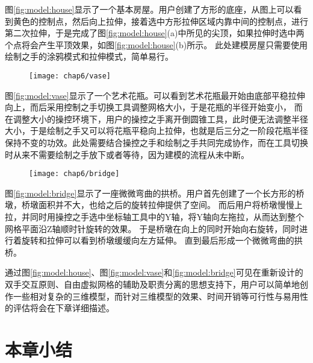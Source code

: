 图\ref{fig:model:house}显示了一个基本房屋。用户创建了方形的底座，从图上可以看到黄色的控制点，然后向上拉伸，接着选中方形拉伸区域内靠中间的控制点，进行第二次拉伸，于是完成了图\ref{fig:model:house}(a)中所见的尖顶，如果拉伸时选中两个点将会产生平顶效果，如图\ref{fig:model:house}(b)所示。
此处建模房屋只需要使用绘制之手的涂鸦模式和拉伸模式，简单易行。

\begin{figure}[t]
  \centering
  \texttt{[image: chap6/vase]}
\end{figure}

图\ref{fig:model:vase}显示了一个艺术花瓶。可以看到艺术花瓶最开始由底部平稳拉伸向上，而后采用控制之手切换工具调整网格大小，于是花瓶的半径开始变小，
而在调整大小的操控环境下，用户的操控之手离开倒圆锥工具，此时便无法调整半径大小，于是绘制之手又可以将花瓶平稳向上拉伸，也就是后三分之一阶段花瓶半径保持不变的功效。此处需要结合操控之手和绘制之手共同完成协作，而在工具切换时从来不需要绘制之手放下或者等待，因为建模的流程从未中断。

\begin{figure}[t]
  \centering
  \texttt{[image: chap6/bridge]}
\end{figure}

图\ref{fig:model:bridge}显示了一座微微弯曲的拱桥。用户首先创建了一个长方形的桥墩，桥墩面积并不大，也给之后的旋转拉伸提供了空间。
而后用户将桥墩慢慢上拉，并同时用操控之手选中坐标轴工具中的Y轴，将Y轴向左拖拉，从而达到整个网格平面沿Z轴顺时针旋转的效果。
于是桥墩在向上的同时开始向右旋转，同时进行着旋转和拉伸可以看到桥墩缓缓向左方延伸。
直到最后形成一个微微弯曲的拱桥。

通过图\ref{fig:model:house}、图\ref{fig:model:vase}和\ref{fig:model:bridge}可见在重新设计的双手交互原则、自由虚拟网格的辅助及职责分离的思想支持下，用户可以简单地创作一些相对复杂的三维模型，而针对三维模型的效果、时间开销等可行性与易用性的评估将会在下章详细描述。

\section{本章小结}


